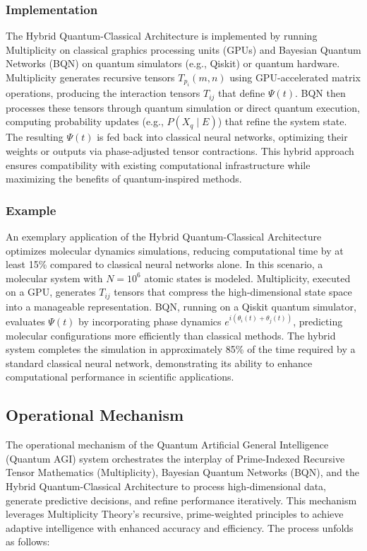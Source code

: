 \documentclass[12pt]{article}
\begin{document}
\subsubsection{Implementation}
The Hybrid Quantum-Classical Architecture is implemented by running Multiplicity on classical graphics processing units (GPUs) and Bayesian Quantum Networks (BQN) on quantum simulators (e.g., Qiskit) or quantum hardware. Multiplicity generates recursive tensors \( T_{p_i}(m, n) \) using GPU-accelerated matrix operations, producing the interaction tensors \( T_{ij} \) that define \( \Psi(t) \). BQN then processes these tensors through quantum simulation or direct quantum execution, computing probability updates (e.g., \( P(X_q \mid E) \)) that refine the system state. The resulting \( \Psi(t) \) is fed back into classical neural networks, optimizing their weights or outputs via phase-adjusted tensor contractions. This hybrid approach ensures compatibility with existing computational infrastructure while maximizing the benefits of quantum-inspired methods.

\subsubsection{Example}
An exemplary application of the Hybrid Quantum-Classical Architecture optimizes molecular dynamics simulations, reducing computational time by at least 15\% compared to classical neural networks alone. In this scenario, a molecular system with \( N = 10^6 \) atomic states is modeled. Multiplicity, executed on a GPU, generates \( T_{ij} \) tensors that compress the high-dimensional state space into a manageable representation. BQN, running on a Qiskit quantum simulator, evaluates \( \Psi(t) \) by incorporating phase dynamics \( e^{i(\theta_i(t) + \theta_j(t))} \), predicting molecular configurations more efficiently than classical methods. The hybrid system completes the simulation in approximately 85\% of the time required by a standard classical neural network, demonstrating its ability to enhance computational performance in scientific applications.

\subsection{Operational Mechanism}

The operational mechanism of the Quantum Artificial General Intelligence (Quantum AGI) system orchestrates the interplay of Prime-Indexed Recursive Tensor Mathematics (Multiplicity), Bayesian Quantum Networks (BQN), and the Hybrid Quantum-Classical Architecture to process high-dimensional data, generate predictive decisions, and refine performance iteratively. This mechanism leverages Multiplicity Theory’s recursive, prime-weighted principles to achieve adaptive intelligence with enhanced accuracy and efficiency. The process unfolds as follows:
\end{document}
